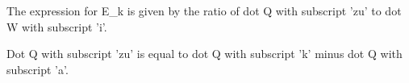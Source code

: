 The expression for E_k is given by the ratio of dot Q with subscript 'zu' to dot W with subscript 'i'.

Dot Q with subscript 'zu' is equal to dot Q with subscript 'k' minus dot Q with subscript 'a'.